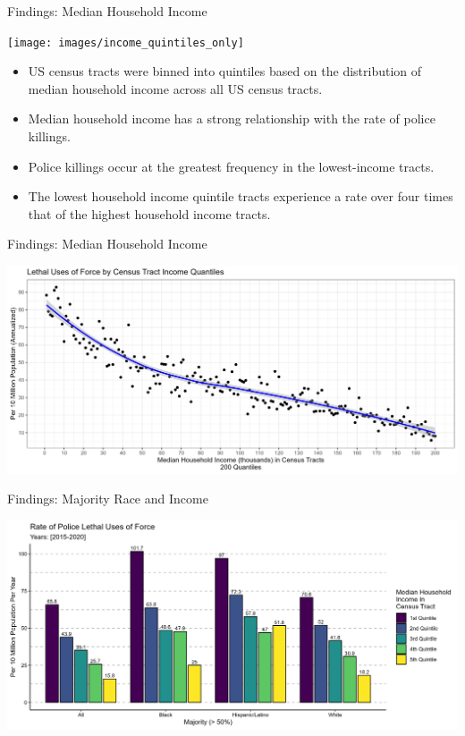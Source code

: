 \documentclass{beamer}
\begin{document}
\begin{frame}{Findings: Median Household Income}
	\begin{center}
	\texttt{[image: images/income\_quintiles\_only]}
	\end{center}
	
	\vspace*{24pt}
	
	\begin{itemize}
	\item US census tracts were binned into quintiles based on the distribution of median household income across all US census tracts. 
	\item Median household income has a strong relationship with the rate of police killings. 
	\item Police killings occur at the greatest frequency in the lowest-income tracts. 
	\item The lowest household income quintile tracts experience a rate over four times that of the highest household income tracts.
	\end{itemize}
\end{frame}

\begin{frame}{Findings: Median Household Income}
	\begin{center}
		\includegraphics[width=\linewidth]{images/all_200}
	\end{center}
\end{frame}

\begin{frame}{Findings: Majority Race and Income}
	\begin{center}
		\includegraphics[width=\linewidth]{images/race_only_denom_race}
	\end{center}
\end{frame}
\end{document}
